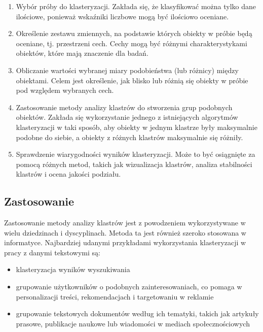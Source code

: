 			\begin{enumerate}
				\item Wybór próby do klasteryzacji. Zakłada się, że klasyfikować można tylko dane ilościowe, ponieważ wskaźniki liczbowe mogą być ilościowo oceniane.
				\item Określenie zestawu zmiennych, na podstawie których obiekty w próbie będą oceniane, tj. przestrzeni cech. Cechy mogą być różnymi charakterystykami obiektów, które mają znaczenie dla badań.
				\item Obliczanie wartości wybranej miary podobieństwa (lub różnicy) między obiektami. Celem jest określenie, jak blisko lub różnią się obiekty w próbie pod względem wybranych cech.
				\item Zastosowanie metody analizy klastrów do stworzenia grup podobnych obiektów. Zakłada się wykorzystanie jednego z istniejących algorytmów klasteryzacji w taki sposób, aby obiekty w jednym klastrze były maksymalnie podobne do siebie, a obiekty z różnych klastrów maksymalnie się różniły.
				\item Sprawdzenie wiarygodności wyników klasteryzacji. Może to być osiągnięte za pomocą różnych metod, takich jak wizualizacja klastrów, analiza stabilności klastrów i ocena jakości podziału.
			\end{enumerate}

	\subsection{Zastosowanie}
		Zastosowanie metody analizy klastrów jest z powodzeniem wykorzystywane w wielu dziedzinach i dyscyplinach. Metoda ta jest również szeroko stosowana w informatyce. Najbardziej udanymi przykładami wykorzystania klasteryzacji w pracy z danymi tekstowymi są:
			
			\begin{itemize}
				\item klasteryzacja wyników wyszukiwania
				\item grupowanie użytkowników o podobnych zainteresowaniach, co pomaga w personalizacji treści, rekomendacjach i targetowaniu w reklamie
				\item grupowanie tekstowych dokumentów według ich tematyki, takich jak artykuły prasowe, publikacje naukowe lub wiadomości w mediach społecznościowych
			\end{itemize}

